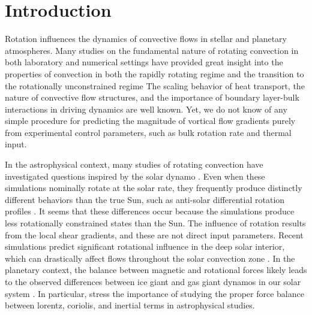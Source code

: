 \documentclass[twocolumn, amsmath, amsfonts, amssymb, trackchanges]{aastex62}
\begin{document}
\section{Introduction}
\label{sec:intro}
Rotation influences the dynamics of convective flows in
stellar and planetary atmospheres.
Many studies on the fundamental nature of
rotating convection in both laboratory and numerical settings
have provided great insight into the properties of convection 
in both the rapidly rotating regime 
and the transition to the rotationally unconstrained regime 
\citep{king&all2009, zhong&all2009, schmitz&tilgner2009, king&all2012, julien&all2012, king&all2013, ecke&niemela2014, stellmach&all2014, cheng&all2015, gastine&all2016}
The scaling behavior of heat transport, the nature of convective flow
structures, and the importance of boundary layer-bulk interactions in driving dynamics are well known.
Yet, we do not know of any simple procedure for predicting the magnitude of vortical flow gradients 
purely from experimental control parameters, such as bulk rotation rate and thermal input.

In the astrophysical context,
many studies of rotating convection have investigated questions inspired by the solar dynamo
\citep{glatzmaier&gilman1982, busse2002, brown&all2008,
brown&all2010, brown&all2011, augustson&all2012, guerrero&all2013, kapyla&all2014}.
Even when these simulations nominally rotate at the solar rate,
they frequently produce distinctly different behaviors than the true Sun,
such as anti-solar differential rotation profiles  \citep{gastine&all2014, brun&all2017}.
It seems that these differences occur because the simulations produce less rotationally 
constrained states than the Sun. 
The influence of rotation results from the local 
shear gradients, and these are not direct input parameters.
Recent simulations predict significant rotational influence in the deep solar interior, 
which can drastically affect flows throughout the solar convection zone 
\citep{featherstone&hindman2016, greer&all2016}. 
In the planetary context, the balance between magnetic
and rotational forces likely leads to the observed differences between ice
giant and gas giant dynamos in our solar system \citep{soderlund&all2015}.
In particular, \cite{aurnou&king2017} stress the importance of studying the proper
force balance between lorentz, coriolis, and inertial terms in astrophysical studies.
\end{document}
